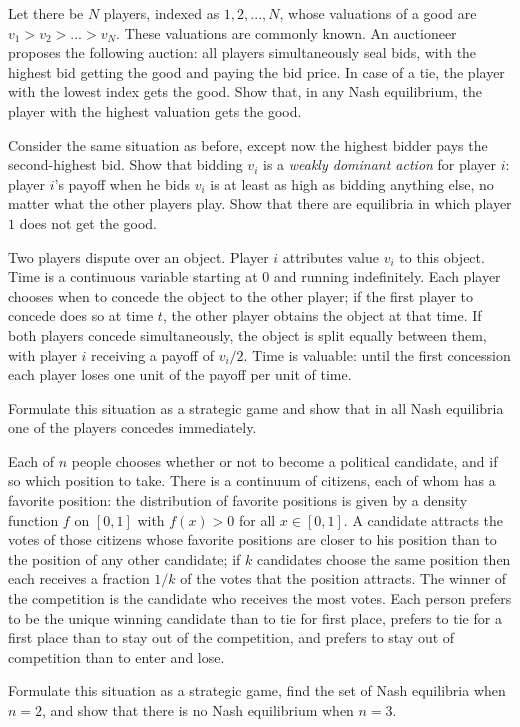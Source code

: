 \documentclass[../../main.tex]{subfiles}
\begin{document}
    \begin{myexe}
        Let there be $N$ players, indexed as $1,2,...,N$, whose valuations of a good are $v_1>v_2>...>v_N$. These valuations are commonly known. An auctioneer proposes the following auction: all players simultaneously seal bids, with the highest bid getting the good and paying the bid price. In case of a tie, the player with the lowest index gets the good. Show that, in any Nash equilibrium, the player with the highest valuation gets the good.
    \end{myexe}
    \begin{myexe}
        Consider the same situation as before, except now the highest bidder pays the second-highest bid. Show that bidding $v_i$ is a \textit{weakly dominant action} for player $i$: player $i$'s payoff when he bids $v_i$ is at least as high as bidding anything else, no matter what the other players play. Show that there are equilibria in which player $1$ does not get the good.
    \end{myexe}
    \begin{myexe}
        Two players dispute over an object. Player $i$ attributes value $v_i$ to this object. Time is a continuous variable starting at $0$ and running indefinitely. Each player chooses when to concede the object to the other player; if the first player to concede does so at time $t$, the other player obtains the object at that time. If both players concede simultaneously, the object is split equally between them, with player $i$ receiving a payoff of $v_i/2$. Time is valuable: until the first concession each player loses one unit of the payoff per unit of time.

        Formulate this situation as a strategic game and show that in all Nash equilibria one of the players concedes immediately.
    \end{myexe}
    \begin{myexe}
        Each of $n$ people chooses whether or not to become a political candidate, and if so which position to take. There is a continuum of citizens, each of whom has a favorite position: the distribution of favorite positions is given by a density function $f$ on $[0,1]$ with $f(x) > 0$ for all $x\in[0,1]$. A candidate attracts the votes of those citizens whose favorite positions are closer to his position than to the position of any other candidate; if $k$ candidates choose the same position then each receives a fraction $1/k$ of the votes that the position attracts. The winner of the competition is the candidate who receives the most votes. Each person prefers to be the unique winning candidate than to tie for first place, prefers to tie for a first place than to stay out of the competition, and prefers to stay out of competition than to enter and lose.

        Formulate this situation as a strategic game, find the set of Nash equilibria when $n = 2$, and show that there is no Nash equilibrium when $n = 3$.
    \end{myexe}
\end{document}
